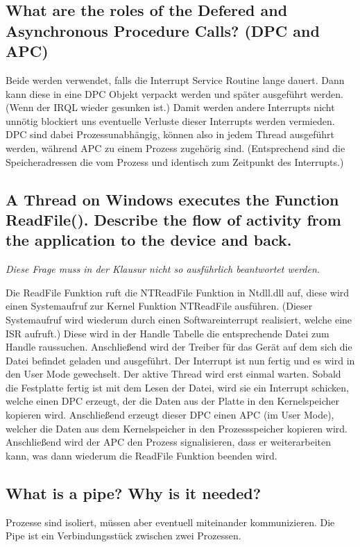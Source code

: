 \subsection{What are the roles of the Defered and Asynchronous Procedure Calls? (DPC and APC)}
Beide werden verwendet, falls die Interrupt Service Routine lange dauert.
Dann kann diese in eine DPC Objekt verpackt werden und später ausgeführt werden.
(Wenn der IRQL wieder gesunken ist.)
Damit werden andere Interrupts nicht unnötig blockiert uns eventuelle Verluste dieser Interrupts werden vermieden.\\
DPC sind dabei Prozessunabhängig, können also in jedem Thread ausgeführt werden, während APC zu einem Prozess zugehörig sind.
(Entsprechend sind die Speicheradressen die vom Prozess und identisch zum Zeitpunkt des Interrupts.)

\subsection{A Thread on Windows executes the Function ReadFile(). Describe the flow of activity from the application to the device and back.}
\textit{Diese Frage muss in der Klausur nicht so ausführlich beantwortet werden.}

Die ReadFile Funktion ruft die NTReadFile Funktion in Ntdll.dll auf, diese wird einen Systemaufruf zur Kernel Funktion NTReadFile ausführen.
(Dieser Systemaufruf wird wiederum durch einen Softwareinterrupt realisiert, welche eine ISR aufruft.)
Diese wird in der Handle Tabelle die entsprechende Datei zum Handle raussuchen.
Anschließend wird der Treiber für das Gerät auf dem sich die Datei befindet geladen und ausgeführt.
Der Interrupt ist nun fertig und es wird in den User Mode gewechselt.
Der aktive Thread wird erst einmal warten.
Sobald die Festplatte fertig ist mit dem Lesen der Datei, wird sie ein Interrupt schicken, welche einen DPC erzeugt, der die Daten aus der Platte in den Kernelspeicher kopieren wird.
Anschließend erzeugt dieser DPC einen APC (im User Mode), welcher die Daten aus dem Kernelspeicher in den Prozessspeicher kopieren wird.
Anschließend wird der APC den Prozess signalisieren, dass er weiterarbeiten kann, was dann wiederum die ReadFile Funktion beenden wird.

\subsection{What is a pipe? Why is it needed?}
Prozesse sind isoliert, müssen aber eventuell miteinander kommunizieren.
Die Pipe ist ein Verbindungsstück zwischen zwei Prozessen.

